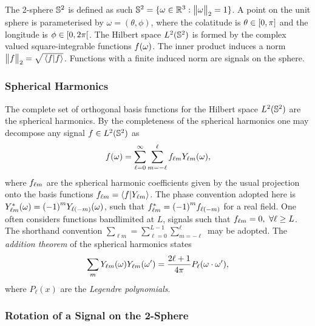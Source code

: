The 2-sphere \(\twoSphere{}\) is defined as such \(\twoSphere{} = \set{\omega \in \mathbb{R}^{3} : \norm{\omega} = 1}\).
A point on the unit sphere is parameterised by \(\omega=(\theta,\phi)\), where the colatitude is \(\theta \in \interval{0}{\pi}\) and the longitude is \(\phi \in \interval[open right]{0}{2\pi}\).
The Hilbert space \(\hilbert{\twoSphere}\) is formed by the complex valued square-integrable functions \(\pixel{f}\).
The inner product induces a norm \(\norm{f} = \sqrt{\braket*{f}}\).
Functions with a finite induced norm are signals on the sphere.

\subsubsection{Spherical Harmonics}

The complete set of orthogonal basis functions for the Hilbert space \(\hilbert{\twoSphere}\) are the spherical harmonics.
By the completeness of the spherical harmonics one may decompose any signal \(f \in \hilbert{\twoSphere}\) as
%
\begin{equation}
	\pixel{f}
	= \sum\limits_{\ell=0}^{\infty} \sum\limits_{m=-\ell}^{\ell} \harmonic{f} \pixel{\harmonic{Y}},
\end{equation}
%
where \(\harmonic{f}\) are the spherical harmonic coefficients given by the usual projection onto the basis functions \(\harmonic{f} = \braket{f}{\harmonic{Y}}\).
The phase convention adopted here is \(\pixel{\conj{\harmonic{Y}}} = {(-1)}^{m} \pixel{Y_{\ell(-m)}}\), such that \({\conj{\harmonic{f}} = {(-1)}^{m} f_{\ell(-m)}}\) for a real field.
One often considers functions bandlimited at \(L\), \ie{} signals such that \(\harmonic{f} = 0,\ \forall \ell \geq L\).
The shorthand convention \(\sum_{\ell m} = \sum_{\ell=0}^{L-1} \sum_{m=-\ell}^{\ell}\) may be adopted.
The \emph{addition theorem} of the spherical harmonics states
%
\begin{equation}\label{eq:chapter3_addition_theorem}
	\sum\limits_{m} \pixel{\harmonic{Y}} \pixel[']{\harmonic{Y}}
	= \factor P_{\ell}(\omega \cdot \omega'),
\end{equation}
%
where \(P_{\ell}(x)\) are the \emph{Legendre polynomials}.

\subsubsection{Rotation of a Signal on the 2-Sphere}

